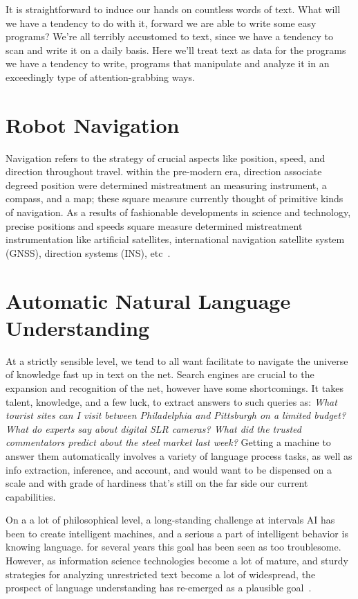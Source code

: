 It is straightforward to induce our hands on countless words of text. What will we have a tendency to do with it, forward we are able to write some easy programs? We're all terribly accustomed to text, since we have a tendency to scan and write it on a daily basis. Here we'll treat text as data for the programs we have a tendency to write, programs that manipulate and analyze it in an exceedingly type of attention-grabbing ways.
\section{Robot Navigation}
Navigation refers to the strategy of crucial aspects like position, speed, and direction throughout travel. within the pre-modern era, direction associate degreed position were determined mistreatment an measuring instrument, a compass, and a map; these square measure currently thought of primitive kinds of navigation. As a results of fashionable developments in science and technology, precise positions and speeds square measure determined mistreatment instrumentation like artificial satellites, international navigation satellite system (GNSS), direction systems (INS), etc~\cite{NAV}.

\section{Automatic Natural Language Understanding}
At a strictly sensible level, we tend to all want facilitate to navigate the universe of knowledge fast up in text on the net. Search engines are crucial to the expansion and recognition of the net, however have some shortcomings. It takes talent, knowledge, and a few luck, to extract answers to such queries as: \emph{What tourist sites can I visit between Philadelphia and Pittsburgh on a limited budget?What do experts say about digital SLR cameras? What did the trusted commentators predict about the steel market last week?} Getting a machine to answer them automatically involves a variety of language process tasks, as well as info extraction, inference, and account, and would want to be dispensed on a scale and with grade of hardiness that's still on the far side our current capabilities.

On a a lot of philosophical level, a long-standing challenge at intervals AI has been to create intelligent machines, and a serious a part of intelligent behavior is knowing language. for several years this goal has been seen as too troublesome. However, as information science technologies become a lot of mature, and sturdy strategies for analyzing unrestricted text become a lot of widespread, the prospect of language understanding has re-emerged as a plausible goal~\cite{NLPbook}.

